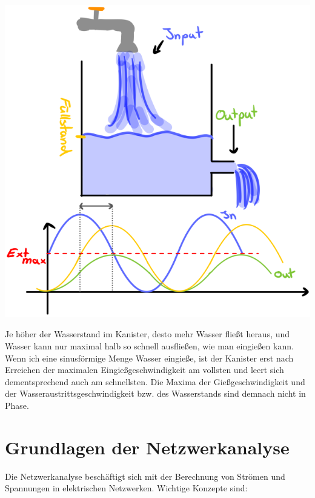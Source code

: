 \documentclass[11pt,a4paper]{article}
\begin{document}
\noindent%
{
  \begin{minipage}[t]{0.4\textwidth}
    \vspace{0pt} %
    \centering
    \includegraphics[width=\textwidth]{analogy.png}

  \end{minipage}%
}
\hfill%
{
  \begin{minipage}[t]{0.55\textwidth}
    \vspace{0pt} %
    
 Je höher der Wasserstand im Kanister, desto mehr Wasser fließt heraus, und Wasser kann nur maximal halb so schnell ausfließen, wie man eingießen kann. Wenn ich eine sinusförmige Menge Wasser eingieße, ist der Kanister erst nach Erreichen der maximalen Eingießgeschwindigkeit am vollsten und leert sich dementsprechend auch am schnellsten. Die Maxima der Gießgeschwindigkeit und der Wasseraustrittsgeschwindigkeit bzw. des Wasserstands sind demnach nicht in Phase.
  \end{minipage}%
}



\newpage
\section{Grundlagen der Netzwerkanalyse}
Die Netzwerkanalyse beschäftigt sich mit der Berechnung von Strömen und Spannungen in elektrischen Netzwerken. Wichtige Konzepte sind:
\end{document}
